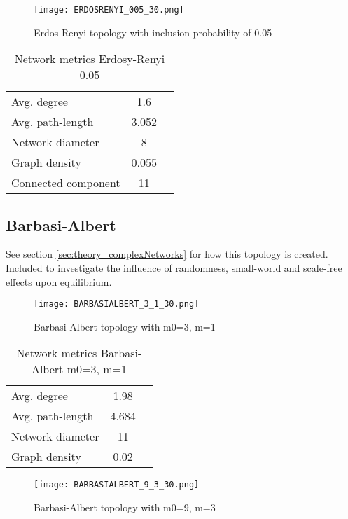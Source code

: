 \documentclass[Bachelorarbeit.tex]{subfiles}
\begin{document}
\begin{figure}[H]
	\centering
  \texttt{[image: ERDOSRENYI\_005\_30.png]}
	\caption{Erdos-Renyi topology with inclusion-probability of 0.05}
	\label{fig:topology_ERDOSRENYI_005_30}
\end{figure}

\begin{table}[H]
	\centering
	\caption{Network metrics Erdosy-Renyi 0.05}
	\begin{tabular} { l c r }
		\hline
		Avg. degree & 1.6 \\
		Avg. path-length & 3.052 \\
		Network diameter & 8 \\
		Graph density & 0.055 \\
		Connected component & 11 \\
		\hline
	\end{tabular}
\end{table}

\pagebreak

\subsection{Barbasi-Albert}
See section \ref{sec:theory_complexNetworks} for how this topology is created. Included to investigate the influence of randomness, small-world and scale-free effects upon equilibrium.

\begin{figure}[H]
	\centering
  \texttt{[image: BARBASIALBERT\_3\_1\_30.png]}
	\caption{Barbasi-Albert topology with m0=3, m=1}
	\label{fig:topology_BARBASIALBERT_3_1_30}
\end{figure}

\begin{table}[H]
	\centering
	\caption{Network metrics Barbasi-Albert m0=3, m=1}
	\begin{tabular} { l c r }
		\hline
		Avg. degree & 1.98 \\
		Avg. path-length & 4.684 \\
		Network diameter & 11 \\
		Graph density & 0.02 \\
		\hline
	\end{tabular}
\end{table}

\begin{figure}[H]
	\centering
  \texttt{[image: BARBASIALBERT\_9\_3\_30.png]}
	\caption{Barbasi-Albert topology with m0=9, m=3}
	\label{fig:topology_BARBASIALBERT_9_3_30}
\end{figure}
\end{document}
